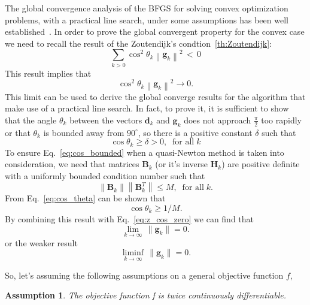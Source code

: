 \documentclass[11pt]{article}
\newtheorem{assumption}[theorem]{Assumption}
\newcommand{\norm}[1]{\left\lVert#1\right\rVert}
\begin{document}
The global convergence analysis of the BFGS for solving convex optimization problems, with a practical line search, under some assumptions has been well established~\cite{nocedal_global_c_quasi_newton,nocedal_global_c_quasi_newton_2, Powell1976SomeGC}. In order to prove the global convergent property for the convex case we need to recall the result of the Zoutendijk's condtion~\ref{th:Zoutendijk}:
\begin{equation}
    \sum_{k > 0 } \cos^2 \theta_k \norm{\mathbf{g}_k}^2 \, < \, 0
\end{equation}
This result implies that
\begin{equation}\label{eq:z_cos_zero}
    \cos^2 \theta_k \norm{\mathbf{g}_k}^2 \rightarrow 0.
\end{equation}
This limit can be used to derive the global converge results for the algorithm that make use of a practical line search. In fact, to prove it, it is sufficient to show that the angle $\theta_k$ between the vectors $\mathbf{d}_k$ and $\mathbf{g}_k$ does not approach $\frac{\pi}{2}$ too rapidly or that $\theta_k$ is bounded away from $90^{\circ}$, so there is a positive constant $\delta$ such that 
\begin{equation}
    \label{eq:cos_bounded}
    \cos \theta_k \geq \delta > 0, \;\; \text{for all}\; k
\end{equation}
To ensure Eq.~\ref{eq:cos_bounded} when a quasi-Newton method is taken into consideration, we need that matrices $\mathbf{B}_k$ (or it's inverse $\mathbf{H}_k$) are positive definite with a uniformly bounded condition number such that
$$\norm{\mathbf{B}_k}\norm{\mathbf{B}_k^T} \leq M,\;\; \text{for all}\; k.$$
From Eq.~\ref{eq:cos_theta} can be shown that
$$ \cos \theta_k \geq 1/M.$$
By combining this result with Eq.~\ref{eq:z_cos_zero} we can find that
$$       \lim_{k\to\infty}  \, \|\mathbf{g}_k\| = 0.$$
or the weaker result
$$       \liminf_{k\to\infty}  \, \|\mathbf{g}_k\| = 0.$$


So, let's assuming the following assumptions on a general objective function $f$,

\begin{assumption}
\label{as:twice_continuous_f}
The objective function f is twice continuously differentiable.
\end{assumption}
\end{document}
